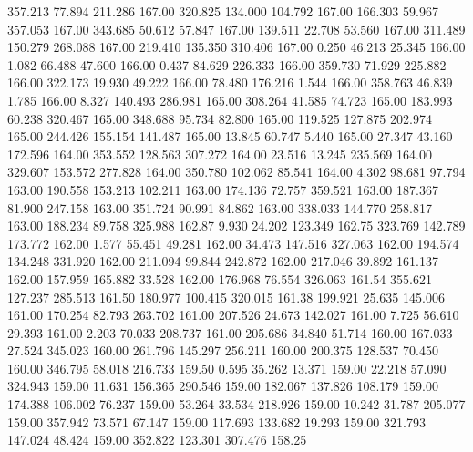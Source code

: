  357.213   77.894  211.286       167.00
 320.825  134.000  104.792       167.00
 166.303   59.967  357.053       167.00
 343.685   50.612   57.847       167.00
 139.511   22.708   53.560       167.00
 311.489  150.279  268.088       167.00
 219.410  135.350  310.406       167.00
   0.250   46.213   25.345       166.00
   1.082   66.488   47.600       166.00
   0.437   84.629  226.333       166.00
 359.730   71.929  225.882       166.00
 322.173   19.930   49.222       166.00
  78.480  176.216    1.544       166.00
 358.763   46.839    1.785       166.00
   8.327  140.493  286.981       165.00
 308.264   41.585   74.723       165.00
 183.993   60.238  320.467       165.00
 348.688   95.734   82.800       165.00
 119.525  127.875  202.974       165.00
 244.426  155.154  141.487       165.00
  13.845   60.747    5.440       165.00
  27.347   43.160  172.596       164.00
 353.552  128.563  307.272       164.00
  23.516   13.245  235.569       164.00
 329.607  153.572  277.828       164.00
 350.780  102.062   85.541       164.00
   4.302   98.681   97.794       163.00
 190.558  153.213  102.211       163.00
 174.136   72.757  359.521       163.00
 187.367   81.900  247.158       163.00
 351.724   90.991   84.862       163.00
 338.033  144.770  258.817       163.00
 188.234   89.758  325.988       162.87
   9.930   24.202  123.349       162.75
 323.769  142.789  173.772       162.00
   1.577   55.451   49.281       162.00
  34.473  147.516  327.063       162.00
 194.574  134.248  331.920       162.00
 211.094   99.844  242.872       162.00
 217.046   39.892  161.137       162.00
 157.959  165.882   33.528       162.00
 176.968   76.554  326.063       161.54
 355.621  127.237  285.513       161.50
 180.977  100.415  320.015       161.38
 199.921   25.635  145.006       161.00
 170.254   82.793  263.702       161.00
 207.526   24.673  142.027       161.00
   7.725   56.610   29.393       161.00
   2.203   70.033  208.737       161.00
 205.686   34.840   51.714       160.00
 167.033   27.524  345.023       160.00
 261.796  145.297  256.211       160.00
 200.375  128.537   70.450       160.00
 346.795   58.018  216.733       159.50
   0.595   35.262   13.371       159.00
  22.218   57.090  324.943       159.00
  11.631  156.365  290.546       159.00
 182.067  137.826  108.179       159.00
 174.388  106.002   76.237       159.00
  53.264   33.534  218.926       159.00
  10.242   31.787  205.077       159.00
 357.942   73.571   67.147       159.00
 117.693  133.682   19.293       159.00
 321.793  147.024   48.424       159.00
 352.822  123.301  307.476       158.25
